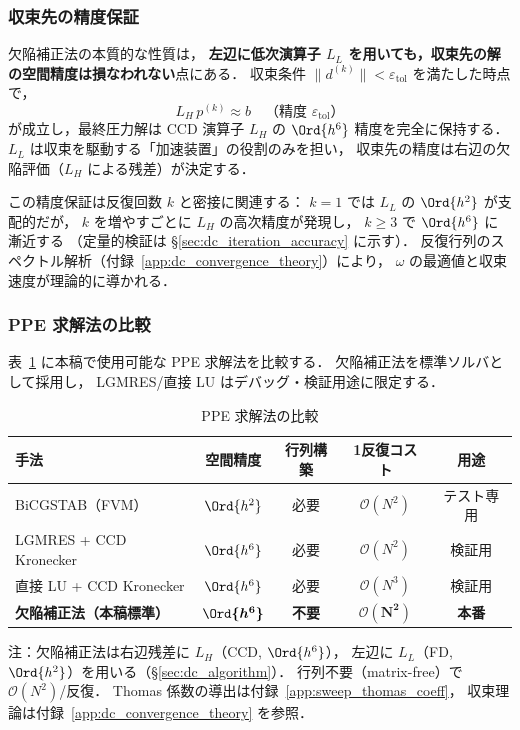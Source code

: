 \subsubsection{収束先の精度保証}
\label{sec:dc_accuracy}

欠陥補正法の本質的な性質は，
\textbf{左辺に低次演算子 $L_L$ を用いても，収束先の解の空間精度は損なわれない}点にある．
収束条件 $\|d^{(k)}\| < \varepsilon_\mathrm{tol}$ を満たした時点で，
\begin{equation}
  L_H\,p^{(k)} \approx b
  \quad\text{（精度 $\varepsilon_\mathrm{tol}$）}
\end{equation}
が成立し，最終圧力解は CCD 演算子 $L_H$ の $\Ord{h^6}$ 精度を完全に保持する．
$L_L$ は収束を駆動する「加速装置」の役割のみを担い，
収束先の精度は右辺の欠陥評価（$L_H$ による残差）が決定する．

この精度保証は反復回数 $k$ と密接に関連する：
$k=1$ では $L_L$ の $\Ord{h^2}$ が支配的だが，
$k$ を増やすごとに $L_H$ の高次精度が発現し，
$k \geq 3$ で $\Ord{h^6}$ に漸近する
（定量的検証は §\ref{sec:dc_iteration_accuracy} に示す）．
反復行列のスペクトル解析（付録~\ref{app:dc_convergence_theory}）により，
$\omega$ の最適値と収束速度が理論的に導かれる．

\subsubsection{PPE 求解法の比較}
\label{sec:dc_comparison}

表~\ref{tab:dc_ppe_methods} に本稿で使用可能な PPE 求解法を比較する．
欠陥補正法を標準ソルバとして採用し，
LGMRES/直接 LU はデバッグ・検証用途に限定する．

\begin{table}[htbp]
\centering
\small
\caption{PPE 求解法の比較}
\label{tab:dc_ppe_methods}
\renewcommand{\arraystretch}{1.3}
\begin{tabular}{lcccc}
\toprule
手法 & 空間精度 & 行列構築 & 1反復コスト & 用途 \\
\midrule
BiCGSTAB（FVM） & $\Ord{h^2}$ & 必要 & $\mathcal{O}(N^2)$ & テスト専用 \\
LGMRES + CCD Kronecker & $\Ord{h^6}$ & 必要 & $\mathcal{O}(N^2)$ & 検証用 \\
直接 LU + CCD Kronecker & $\Ord{h^6}$ & 必要 & $\mathcal{O}(N^3)$ & 検証用 \\
\textbf{欠陥補正法（本稿標準）} & $\boldsymbol{\Ord{h^6}}$ & \textbf{不要} & $\boldsymbol{\mathcal{O}(N^2)}$ & \textbf{本番} \\
\bottomrule
\end{tabular}

\smallskip
\noindent 注：欠陥補正法は右辺残差に $L_H$（CCD, $\Ord{h^6}$），
左辺に $L_L$（FD, $\Ord{h^2}$）を用いる（§\ref{sec:dc_algorithm}）．
行列不要（matrix-free）で $\mathcal{O}(N^2)$/反復．
Thomas 係数の導出は付録~\ref{app:sweep_thomas_coeff}，
収束理論は付録~\ref{app:dc_convergence_theory} を参照．
\end{table}

